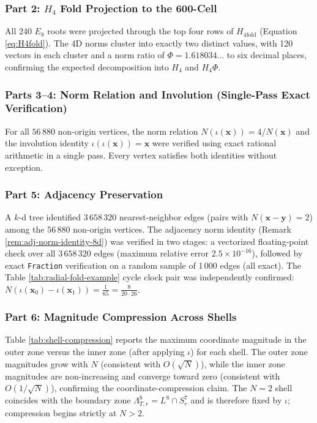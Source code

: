 \documentclass{article}
\begin{document}
\subsubsection{Part 2: $H_4$ Fold Projection to the 600-Cell}
All 240 $E_8$ roots were projected through the top four rows of $H_{4\mathrm{fold}}$ (Equation \ref{eq:H4fold}). The 4D norms cluster into exactly two distinct values, with 120 vectors in each cluster and a norm ratio of $\Phi = 1.618034\ldots$ to six decimal places, confirming the expected decomposition into $H_4$ and $H_4\Phi$.

\subsubsection{Parts 3--4: Norm Relation and Involution (Single-Pass Exact Verification)}
For all $56\,880$ non-origin vertices, the norm relation $N(\iota(\mathbf{x})) = 4/N(\mathbf{x})$ and the involution identity $\iota(\iota(\mathbf{x})) = \mathbf{x}$ were verified using exact rational arithmetic in a single pass. Every vertex satisfies both identities without exception.

\subsubsection{Part 5: Adjacency Preservation}
A $k$-d tree identified $3\,658\,320$ nearest-neighbor edges (pairs with $N(\mathbf{x} - \mathbf{y}) = 2$) among the $56\,880$ non-origin vertices. The adjacency norm identity (Remark \ref{rem:adj-norm-identity-8d}) was verified in two stages: a vectorized floating-point check over all $3\,658\,320$ edges (maximum relative error $2.5 \times 10^{-16}$), followed by exact \texttt{Fraction} verification on a random sample of 1\,000 edges (all exact). The Table \ref{tab:radial-fold-example} cycle clock pair was independently confirmed: $N(\iota(\mathbf{x}_0) - \iota(\mathbf{x}_1)) = \frac{1}{65} = \frac{8}{20 \cdot 26}$.

\subsubsection{Part 6: Magnitude Compression Across Shells}
Table \ref{tab:shell-compression} reports the maximum coordinate magnitude in the outer zone versus the inner zone (after applying $\iota$) for each shell. The outer zone magnitudes grow with $N$ (consistent with $O(\sqrt{N})$), while the inner zone magnitudes are non-increasing and converge toward zero (consistent with $O(1/\sqrt{N})$), confirming the coordinate-compression claim. The $N = 2$ shell coincides with the boundary zone $\Lambda_{T,r}^8 = L^8 \cap S_r^7$ and is therefore fixed by $\iota$; compression begins strictly at $N > 2$.
\end{document}
